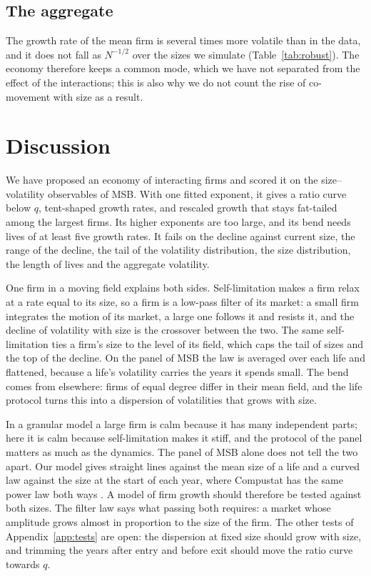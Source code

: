 \documentclass[pre,twocolumn,superscriptaddress,nofootinbib]{revtex4-2}
\begin{document}
\subsection{The aggregate}

The growth rate of the mean firm is several times more volatile than in the data, and it does not fall as $N^{-1/2}$
over the sizes we simulate (Table~\ref{tab:robust}).  The economy therefore keeps a common mode, which we have not
separated from the effect of the interactions; this is also why we do not count the rise of co-movement with size as
a result.

\section{Discussion}
\label{sec:discussion}

We have proposed an economy of interacting firms and scored it on the size--volatility observables of MSB.  With
one fitted exponent, it gives a ratio curve below $q$, tent-shaped growth rates, and rescaled growth that stays
fat-tailed among the largest firms.  Its higher exponents are too large, and its bend needs lives of at least five
growth rates.  It fails on the decline against current size, the range of the decline, the tail of the volatility
distribution, the size distribution, the length of lives and the aggregate volatility.

One firm in a moving field explains both sides.  Self-limitation makes a firm relax at a rate equal to its size, so
a firm is a low-pass filter of its market: a small firm integrates the motion of its market, a large one follows it
and resists it, and the decline of volatility with size is the crossover between the two.  The same self-limitation
ties a firm's size to the level of its field, which caps the tail of sizes and the top of the decline.  On the panel
of MSB the law is averaged over each life and flattened, because a life's volatility carries the years it spends
small.  The bend comes from elsewhere: firms of equal degree differ in their mean field, and the life protocol turns
this into a dispersion of volatilities that grows with size.

In a granular model a large firm is calm because it has many independent parts; here it is calm because
self-limitation makes it stiff, and the protocol of the panel matters as much as the dynamics.  The panel of MSB
alone does not tell the two apart.  Our model gives straight lines against the mean size of a life and a curved law
against the size at the start of each year, where Compustat has the same power law both ways \cite{amaral1997,moran2024}.
A model of firm growth should therefore be tested against both sizes.  The filter law says what passing both
requires: a market whose amplitude grows almost in proportion to the size of the firm.  The other tests of
Appendix~\ref{app:tests} are open: the dispersion at fixed size should grow with size, and trimming the years after
entry and before exit should move the ratio curve towards $q$.
\end{document}
